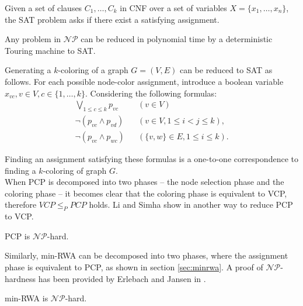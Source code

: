 \begin{definition}[SAT]
Given a set of clauses $C_1, \ldots , C_k$ in CNF over a set of variables $X = \{x_1,\ldots,x_n\}$, the SAT problem asks if there exist a satisfying assignment.
\end{definition}

\begin{theorem}
Any problem in $\mathcal{NP}$ can be reduced in polynomial time by a deterministic Touring machine to SAT.
\end{theorem}

Generating a $k$-coloring of a graph $G=(V,E)$ can be reduced to SAT as follows. For each possible node-color assignment, introduce a boolean variable $x_{vc}, v\in V, c\in \{1,\ldots ,k\}$. Considering the following formulas:
\begin{align}
\bigvee_{1\leq c \leq k}p_{vc} && (v\in V)\\
\neg (p_{vc} \wedge p_{vd}) 		&& (v\in V, 1 \leq i < j \leq k),\\
\neg (p_{vc} \wedge p_{wc})		&& (\{v,w\}\in E, 1 \leq i \leq k).
\end{align}

Finding an assignment satisfying these formulas is a one-to-one correspondence to finding a $k$-coloring of graph $G$.\\

When PCP is decomposed into two phases -- the node selection phase and the coloring phase -- it becomes clear that the coloring phase is equivalent to VCP, therefore $VCP \leq_P PCP$ holds. Li and Simha show in \cite{li-00} another way to reduce PCP to VCP.

\begin{theorem}
PCP is $\mathcal{NP}$-hard.
\end{theorem}

Similarly, min-RWA can be decomposed into two phases, where the assignment phase is equivalent to PCP, as shown in section \ref{sec:minrwa}. A proof of $\mathcal{NP}$-hardness has been provided by Erlebach and Jansen in \cite{erlebach-01}.

\begin{theorem}
min-RWA is $\mathcal{NP}$-hard.
\end{theorem}